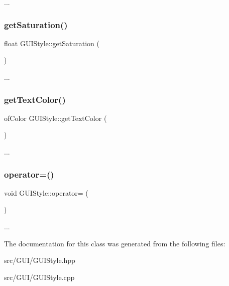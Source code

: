 ... \mbox{\label{class_g_u_i_style_a8e144ad547eda85e84c9d5f9174c7306}} 
\subsubsection{\texorpdfstring{get\+Saturation()}{getSaturation()}}
{\footnotesize\ttfamily float G\+U\+I\+Style\+::get\+Saturation (\begin{DoxyParamCaption}{ }\end{DoxyParamCaption})}

... \mbox{\label{class_g_u_i_style_a89fb46a154fc64e5e668e5e86dfc2b2d}} 
\subsubsection{\texorpdfstring{get\+Text\+Color()}{getTextColor()}}
{\footnotesize\ttfamily of\+Color G\+U\+I\+Style\+::get\+Text\+Color (\begin{DoxyParamCaption}{ }\end{DoxyParamCaption})}

... \mbox{\label{class_g_u_i_style_a2cb598ebf5929b19899db5f51c941bac}} 
\subsubsection{\texorpdfstring{operator=()}{operator=()}}
{\footnotesize\ttfamily void G\+U\+I\+Style\+::operator= (\begin{DoxyParamCaption}\item[{\hyperlink{class_g_u_i_style}{G\+U\+I\+Style} const \&}]{ }\end{DoxyParamCaption})\hspace{0.3cm}{\ttfamily [delete]}}

... 

The documentation for this class was generated from the following files\+:\begin{DoxyCompactItemize}
\item 
src/\+G\+U\+I/G\+U\+I\+Style.\+hpp\item 
src/\+G\+U\+I/G\+U\+I\+Style.\+cpp\end{DoxyCompactItemize}
